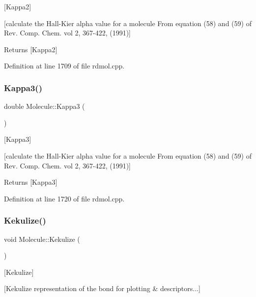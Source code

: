 \mbox{[}Kappa2\mbox{]} 

\mbox{[}calculate the Hall-\/\+Kier alpha value for a molecule From equation (58) and (59) of Rev. Comp. Chem. vol 2, 367-\/422, (1991)\mbox{]}

\begin{DoxyReturn}{Returns}
\mbox{[}Kappa2\mbox{]} 
\end{DoxyReturn}


Definition at line 1709 of file rdmol.\+cpp.

\mbox{\label{class_molecule_a46bf5206450f9a17bd2c256a7f37ab8b}} 
\subsubsection{\texorpdfstring{Kappa3()}{Kappa3()}}
{\footnotesize\ttfamily double Molecule\+::\+Kappa3 (\begin{DoxyParamCaption}{ }\end{DoxyParamCaption})}



\mbox{[}Kappa3\mbox{]} 

\mbox{[}calculate the Hall-\/\+Kier alpha value for a molecule From equation (58) and (59) of Rev. Comp. Chem. vol 2, 367-\/422, (1991)\mbox{]}

\begin{DoxyReturn}{Returns}
\mbox{[}Kappa3\mbox{]} 
\end{DoxyReturn}


Definition at line 1720 of file rdmol.\+cpp.

\mbox{\label{class_molecule_ac70bc19bc462d250f2c4de320bd3330c}} 
\subsubsection{\texorpdfstring{Kekulize()}{Kekulize()}}
{\footnotesize\ttfamily void Molecule\+::\+Kekulize (\begin{DoxyParamCaption}{ }\end{DoxyParamCaption})}



\mbox{[}Kekulize\mbox{]} 

\mbox{[}Kekulize representation of the bond for plotting \& descriptors...\mbox{]}


